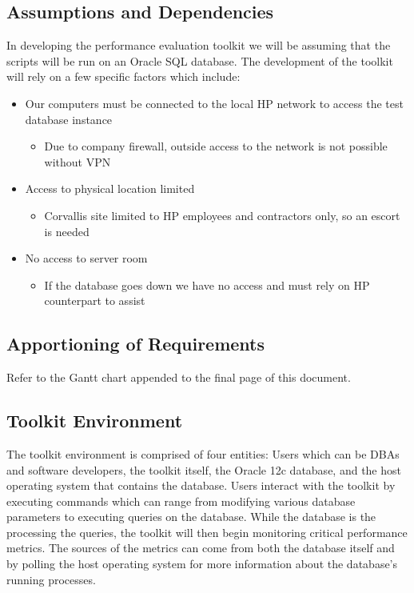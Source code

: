 \documentclass[draftclsnofoot, onecolumn, compsoc, 10pt]{IEEEtran}
\begin{document}
\subsection{Assumptions and Dependencies}
In developing the performance evaluation toolkit we will be assuming that the scripts will be run on an Oracle SQL database.
The development of the toolkit will rely on a few specific factors which include:
\begin{itemize}
	\item Our computers must be connected to the local HP network to access the test database instance
    \begin{itemize}
    	\item Due to company firewall, outside access to the network is not possible without VPN
    \end{itemize}
	\item Access to physical location limited
    \begin{itemize}
    	\item Corvallis site limited to HP employees and contractors only, so an escort is needed
    \end{itemize}
	\item No access to server room
    \begin{itemize}
    	\item If the database goes down we have no access and must rely on HP counterpart to assist
    \end{itemize}
\end{itemize}

\subsection{Apportioning of Requirements}
Refer to the Gantt chart appended to the final page of this document.

\subsection{Toolkit Environment}
The toolkit environment is comprised of four entities: Users which can be DBAs and software developers, the toolkit itself, the Oracle 12c database, and the host operating system that contains the database. Users interact with the toolkit by executing commands which can range from modifying various database parameters to executing queries on the database. While the database is the processing the queries, the toolkit will then begin monitoring critical performance metrics. The sources of the metrics can come from both the database itself and by polling the host operating system for more information about the database’s running processes.
\end{document}
